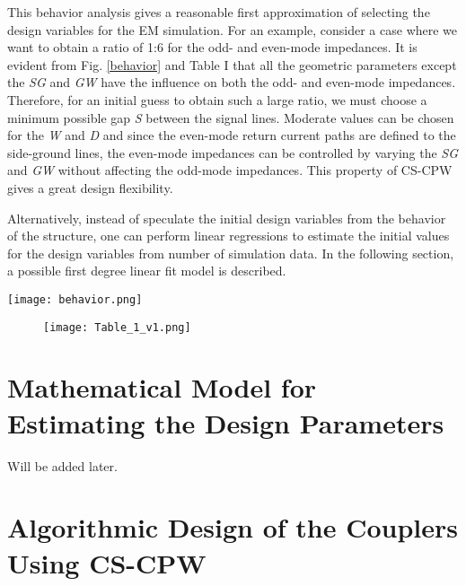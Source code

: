 \documentclass[journal]{IEEEtran}
\begin{document}
This behavior analysis gives a reasonable first approximation of selecting the design variables for the EM simulation. For an example, consider a case where we want to obtain a ratio of 1:6 for the odd- and even-mode impedances. It is evident from Fig. \ref{behavior} and Table I that all the geometric parameters except the \textit{SG} and \textit{GW} have the influence on both the odd- and even-mode impedances. Therefore, for an initial guess to obtain such a large ratio, we must choose a minimum possible gap \textit{S} between the signal lines. Moderate values can be chosen for the \textit{W} and \textit{D} and since the even-mode return current paths are defined to the side-ground lines, the even-mode impedances can be controlled by varying the \textit{SG} and \textit{GW} without affecting the odd-mode impedances. This property of CS-CPW gives a great design flexibility.

Alternatively, instead of speculate the initial design variables from the behavior of the structure, one can perform linear regressions to estimate the initial values for the design variables from number of simulation data. In the following section, a possible first degree linear fit model is described.

\begin{figure*}
	\texttt{[image: behavior.png]}
	\caption{Effect of the gap \textit{S}, shielding distance \textit{D}, signal width \textit{W}, ground width \textit{GW}, and signal to ground gap \textit{SG} over the odd- and even-mode inductances, capacitances, and characteristic impedances.}
	\label{behavior}
\end{figure*}

\begin{figure}
	\texttt{[image: Table\_1\_v1.png]}
	\label{Table1}
\end{figure}

\section{Mathematical Model for Estimating the Design Parameters}
Will be added later.


\section{Algorithmic Design of the Couplers Using CS-CPW}
\end{document}
